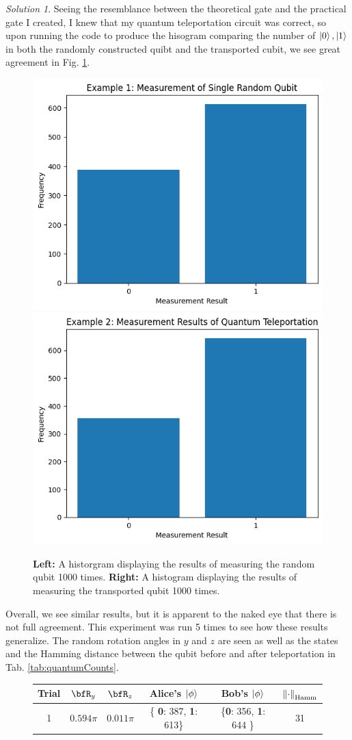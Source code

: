 \documentclass[a4paper,12pt]{article}
\theoremstyle{definition}
\theoremstyle{remark}
\newtheorem*{solution}{Solution}
\begin{document}
\begin{solution}
		Seeing the resemblance between the theoretical gate and the practical gate I created, I knew that my quantum teleportation circuit was correct, so upon running the code to produce the hisogram comparing the number of $\ket{0}, \ket{1}$ in both the randomly constructed quibt and the transported cubit, we see great agreement in Fig. \ref{fig:circuit1}.
		\begin{figure}[h]
			\centering
			\includegraphics[width=0.45\linewidth]{Circuit1}
			\includegraphics[width=0.45\linewidth]{Circuit2}
			\caption{\textbf{Left:} A historgram displaying the results of measuring the random qubit 1000 times. \textbf{Right:} A histogram displaying the results of measuring the transported qubit 1000 times.}
			\label{fig:circuit1}
		\end{figure}
		Overall, we see similar results, but it is apparent to the naked eye that there is not full agreement. This experiment was run 5 times to see how these results generalize. The random rotation angles in $y$ and $z$ are seen as well as the states and the Hamming distance between the qubit before and after teleportation in Tab. \ref{tab:quantumCounts}. 
		\begin{figure}[h]
			\centering
			\begin{tabular}{|c|c|c|c|c|c|}
				\hline
				Trial &$\bfR_y$&$\bfR_z $ & Alice's $\ket{\phi}$   & Bob's $\ket{\phi}$ & $\norm{\cdot}_{\text{Hamm}}$   \\
				\hline
				1& $0.594\pi$ &$0.011\pi$  &  \{ \textbf{0}: 387, \textbf{1}: 613\}&\{\textbf{0}: 356, \textbf{1}: 644 \}  & 31  \\

\end{tabular}
\end{figure}
\end{solution}
\end{document}
